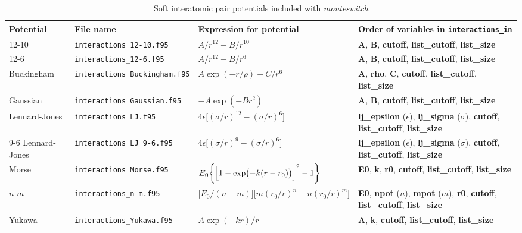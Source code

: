 \documentclass{report}
\begin{document}
\begin{landscape}
\begin{center}\label{table:pair_potentials}
\begin{longtable}{ l l l p{5cm} }
\caption{Soft interatomic pair potentials included with \emph{monteswitch}}
\\
Potential & File name & Expression for potential & Order of variables in \texttt{interactions\_in}  \\

\hline

12-10 & \texttt{interactions\_12-10.f95} & $A/r^{12}-B/r^{10}$ 
& \textbf{A}, \textbf{B}, \textbf{cutoff}, \textbf{list\_cutoff}, \textbf{list\_size} \\

12-6  &  \texttt{interactions\_12-6.f95} & $A/r^{12}-B/r^{6}$ 
& \textbf{A}, \textbf{B}, \textbf{cutoff}, \textbf{list\_cutoff}, \textbf{list\_size} \\

Buckingham & \texttt{interactions\_Buckingham.f95} & $A\exp(-r/\rho)-C/r^6$ 
& \textbf{A}, \textbf{rho}, \textbf{C}, \textbf{cutoff}, \textbf{list\_cutoff}, \textbf{list\_size} \\

Gaussian & \texttt{interactions\_Gaussian.f95} & $-A\exp(-Br^2)$ 
& \textbf{A}, \textbf{B}, \textbf{cutoff}, \textbf{list\_cutoff}, \textbf{list\_size} \\

Lennard-Jones & \texttt{interactions\_LJ.f95} & $4\epsilon\bigl[(\sigma/r)^{12}-(\sigma/r)^6\bigr]$
& \textbf{lj\_epsilon} ($\epsilon$), \textbf{lj\_sigma} ($\sigma$), \textbf{cutoff}, \textbf{list\_cutoff}, \textbf{list\_size} \\

9-6 Lennard-Jones & \texttt{interactions\_LJ\_9-6.f95} & $4\epsilon\bigl[(\sigma/r)^9-(\sigma/r)^6\bigr]$
& \textbf{lj\_epsilon} ($\epsilon$), \textbf{lj\_sigma} ($\sigma$), \textbf{cutoff}, \textbf{list\_cutoff}, \textbf{list\_size} \\

Morse & \texttt{interactions\_Morse.f95} & $E_0\bigg\lbrace \Bigl[1-\exp\bigl(-k(r-r_0)\bigr)\Bigr]^2 -1 \biggr\rbrace$ 
& \textbf{E0}, \textbf{k}, \textbf{r0}, \textbf{cutoff}, \textbf{list\_cutoff}, \textbf{list\_size} \\

$n$-$m$ & \texttt{interactions\_n-m.f95} & $\displaystyle\bigl[E_0/(n-m)\bigr]\bigl[m(r_0/r)^n-n(r_0/r)^m\bigr]$
& \textbf{E0}, \textbf{npot} ($n$), \textbf{mpot} ($m$), \textbf{r0}, \textbf{cutoff}, \textbf{list\_cutoff}, \textbf{list\_size} \\

Yukawa & \texttt{interactions\_Yukawa.f95} & $A\exp(-kr)/r$ 
& \textbf{A}, \textbf{k}, \textbf{cutoff}, \textbf{list\_cutoff}, \textbf{list\_size} \\

\end{longtable}
\end{center}
\end{landscape}
\end{document}
